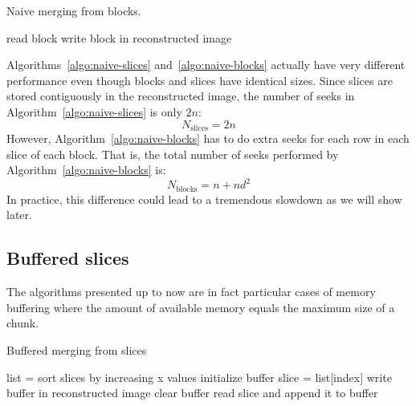 \documentclass[10pt, conference, compsocconf]{IEEEtran}
\begin{document}
\begin{algorithm}[h]
\caption{Naive merging from blocks.}
\label{algo:naive-blocks}
\begin{algorithmic}
    \STATE read block
    \STATE write block in reconstructed image
  \ENDFOR 
\end{algorithmic}
\end{algorithm}

Algorithms~\ref{algo:naive-slices} and~\ref{algo:naive-blocks}
actually have very different performance even though blocks and slices
have identical sizes. Since slices are stored contiguously in the
reconstructed image, the number of seeks in
Algorithm~\ref{algo:naive-slices} is only $2n$:
\begin{equation}
  N_\mathrm{slices} = 2n 
\end{equation}
However,
Algorithm~\ref{algo:naive-blocks} has to do extra seeks for each row
in each slice of each block. That is, the total number of seeks
performed by Algorithm~\ref{algo:naive-blocks} is:
\begin{equation}
N_\mathrm{blocks} = n+nd^2 
\end{equation}
In
practice, this difference could lead to a tremendous slowdown as we will show
later.


\subsection{Buffered slices}

The algorithms presented up to now are in fact particular cases of
memory buffering where the amount of available memory equals the
maximum size of a chunk. 

\begin{algorithm}[h]
  \caption{Buffered merging from slices}
  \label{algo:buffered-slices}
  \begin{algorithmic}[1]
    \STATE list = sort slices by increasing x values
    \STATE initialize buffer
      \STATE slice = list[index]
        \STATE write buffer in reconstructed image
        \STATE clear buffer
      \ENDIF
      \STATE read slice and append it to buffer
    \ENDFOR
  \end{algorithmic}
\end{algorithm}
\end{document}
